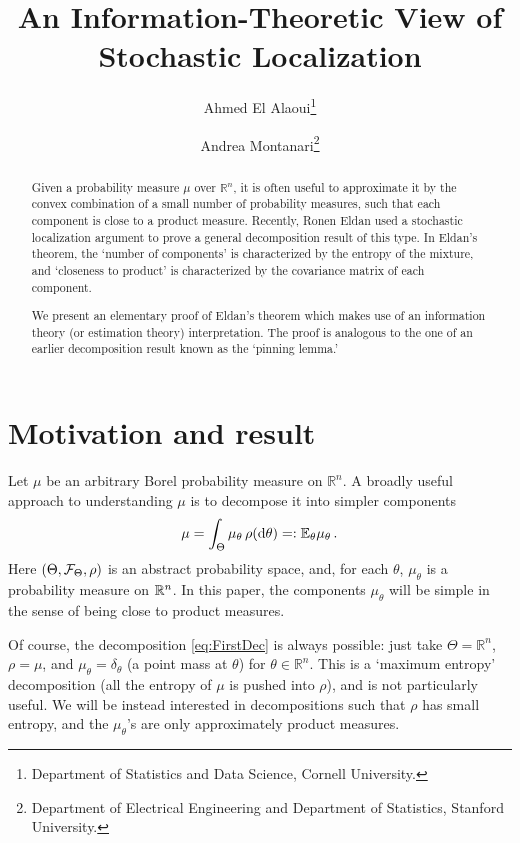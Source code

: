 \documentclass[11pt]{article}
\numberwithin{equation}{section}
\theoremstyle{myremark}
\theoremstyle{myremark}
\theoremstyle{myexample}
\newcommand{\R}{\mathbb{R}}
\newcommand{\1}{\mathbf{1}}
\begin{document}
\title{An Information-Theoretic View of Stochastic Localization}

\author{Ahmed El Alaoui\thanks{ Department of Statistics and Data Science, Cornell University.} \and Andrea Montanari\thanks{Department of Electrical Engineering and
  Department of Statistics, Stanford University.}
}
\date{}

\maketitle

\begin{abstract}
Given a probability measure $\mu$ over $\R^n$, it is often useful to approximate it 
by the convex combination of a small number of probability measures,
such that each component is close to a product measure.
Recently, Ronen Eldan used a stochastic localization argument to prove a general decomposition 
result of this type. In Eldan's theorem, the `number of components' is characterized by the 
entropy of the mixture, and `closeness to product' is characterized by the covariance matrix
of each component.

We present an elementary proof of Eldan's theorem which makes use of an information theory 
(or estimation theory) interpretation. The proof is analogous to the one of an earlier
decomposition result known as the `pinning lemma.'
\end{abstract}


\section{Motivation and result}

Let $\mu$ be an arbitrary Borel probability measure on $\R^n$.  A broadly useful
approach to understanding $\mu$ is to decompose it into simpler components
%
\begin{align}
\mu =\int_{\Theta} \mu_{\theta}\, \rho({\rm d}\theta) =: {\mathbb E}_{\theta}\mu_{\theta}\, .
\label{eq:FirstDec}
\end{align}
%
Here $(\Theta,{\mathcal F}_{\Theta},\rho)$ is an abstract probability space, and, for each
$\theta$, $\mu_{\theta}$ is a probability measure on ${\mathbb R}^n$.
In this paper, the components $\mu_{\theta}$ will be simple in the sense 
of being close to product measures. 

Of course, the decomposition  \eqref{eq:FirstDec} is always possible:
just take $\Theta=\R^n$, $\rho = \mu$, and $\mu_{\theta}=\delta_{\theta}$ 
(a point mass at $\theta$) for $\theta\in\R^n$. This is a `maximum entropy' decomposition
(all the entropy of $\mu$ is pushed into $\rho$), and is not particularly useful. 
We will be instead interested in decompositions such that $\rho$ has small entropy, and
the $\mu_{\theta}$'s are only approximately product measures.
\end{document}

